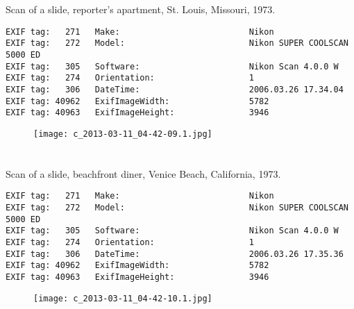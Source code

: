 \section{\protect{}}
\noindent Scan of a slide, reporter's apartment, St. Louis, Missouri, 1973.
\noindent
\begin{lstlisting}
EXIF tag:   271   Make:                          Nikon
EXIF tag:   272   Model:                         Nikon SUPER COOLSCAN 5000 ED
EXIF tag:   305   Software:                      Nikon Scan 4.0.0 W
EXIF tag:   274   Orientation:                   1
EXIF tag:   306   DateTime:                      2006.03.26 17.34.04
EXIF tag: 40962   ExifImageWidth:                5782
EXIF tag: 40963   ExifImageHeight:               3946

\end{lstlisting}
\clearpage
\begin{figure}
\raggedleft
\texttt{[image: c\_2013-03-11\_04-42-09.1.jpg]}
\end{figure}


\clearpage
\section{\protect{}}
\noindent Scan of a slide, beachfront diner, Venice Beach, California, 1973.
\noindent
\begin{lstlisting}
EXIF tag:   271   Make:                          Nikon
EXIF tag:   272   Model:                         Nikon SUPER COOLSCAN 5000 ED
EXIF tag:   305   Software:                      Nikon Scan 4.0.0 W
EXIF tag:   274   Orientation:                   1
EXIF tag:   306   DateTime:                      2006.03.26 17.35.36
EXIF tag: 40962   ExifImageWidth:                5782
EXIF tag: 40963   ExifImageHeight:               3946

\end{lstlisting}
\clearpage
\begin{figure}
\raggedleft
\texttt{[image: c\_2013-03-11\_04-42-10.1.jpg]}
\end{figure}


\clearpage
